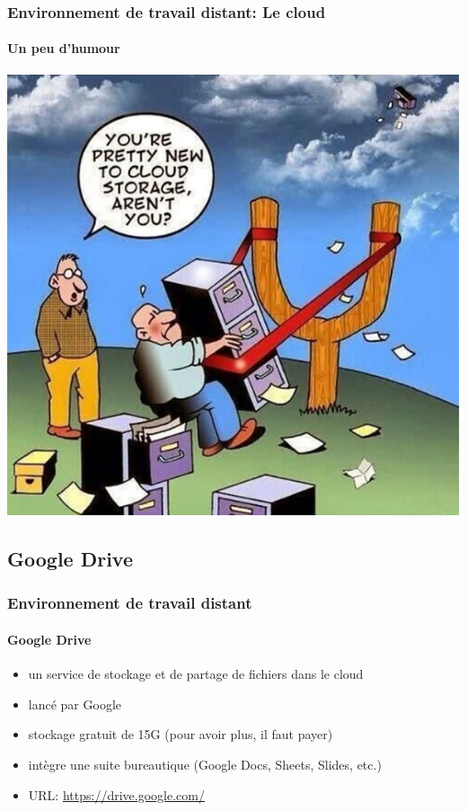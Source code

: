 \documentclass[xcolor=table]{beamer}
\begin{document}
\begin{frame}
\frametitle{Environnement de travail distant: Le cloud}
\framesubtitle{Un peu d'humour}

\begin{center}
	\includegraphics[height=
.8\textheight]{../img/Bweb01-environnement/cloud-humour.png}
\end{center}

\end{frame}

\subsection{Google Drive}

\begin{frame}
\frametitle{Environnement de travail distant}
\framesubtitle{Google Drive}

\begin{itemize}
	\item un service de stockage et de partage de fichiers dans le cloud
	\item lancé par Google
	\item stockage gratuit de 15G (pour avoir plus, il faut payer)
	\item intègre une suite bureautique (Google Docs, Sheets, Slides, etc.)
	\item URL: \url{https://drive.google.com/}
\end{itemize}

\end{frame}
\end{document}
